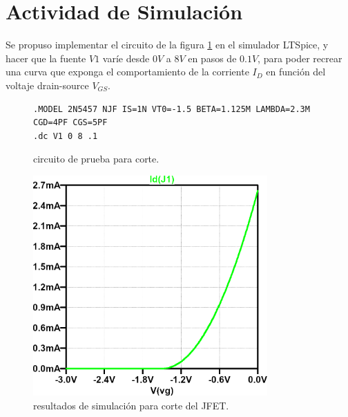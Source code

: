 \section{Actividad de Simulación}
    Se propuso implementar el circuito de la figura \ref{crkt:jfet-corte} en el simulador LTSpice, y hacer que la fuente
    $V1$ varíe desde $0V$ a $8V$ en pasos de $0.1V$, para poder recrear una curva que exponga el comportamiento de la
    corriente $I_D$ en función del voltaje drain-source $V_{GS}$.
    \begin{figure}[!ht]
      \centering
      \begin{minipage}{0.45\textwidth}
        \caption{circuito de prueba para corte.}
        \label{crkt:jfet-corte}
      \end{minipage}
      \hfill
      \begin{minipage}{0.45\textwidth}
        \begin{lstlisting}[style=ltspice, caption={Parámetros de simulación LTspice}, label=list:jfet-corte]
.MODEL 2N5457 NJF IS=1N VT0=-1.5 BETA=1.125M LAMBDA=2.3M CGD=4PF CGS=5PF
.dc V1 0 8 .1
        \end{lstlisting}
      \end{minipage}
    \end{figure}

    \begin{figure}[!ht]
      \centering
      \includegraphics[width=0.8\textwidth]{images/corte-id_vgs.png}
      \caption{resultados de simulación para corte del JFET.}
      \label{fig:sim.corte}
    \end{figure}

